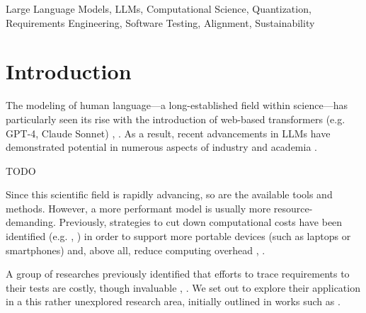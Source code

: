 \documentclass[conference]{IEEEtran}
\begin{document}
\begin{IEEEkeywords}
Large Language Models, LLMs, Computational Science, Quantization, Requirements
Engineering, Software Testing, Alignment, Sustainability
\end{IEEEkeywords}

\section{Introduction}\label{intro}


The modeling of human language---a long-established field within science---has
particularly seen its rise with the introduction of web-based transformers
(e.g. GPT-4, Claude Sonnet) \cite{jonesNaturalLanguageProcessing1994},
\cite{vaswaniAttentionAllYou2017}. As a result, recent advancements in LLMs
have demonstrated potential in numerous aspects of industry and academia
\cite{naveedComprehensiveOverviewLarge2024}.

TODO


Since this scientific field is rapidly advancing, so are the available tools and
methods. However, a more performant model is usually more resource-demanding.
Previously, strategies to cut down computational costs have been identified
(e.g. \cite{linAWQActivationawareWeight2024},
\cite{chenEfficientQATEfficientQuantizationAware2024}) in order to support more
portable devices (such as laptops or smartphones) and, above all, reduce
computing overhead \cite{zhuSurveyModelCompression2024},
\cite{rasleyDeepSpeedSystemOptimizations2020}.

A group of researches previously identified that efforts to trace requirements
to their tests are costly, though invaluable \cite{barmi2011Alignment}, \cite{AutomatedAlignmentSoftware}.
We set out to explore their application in a this rather unexplored research
area, initially outlined in works such as \cite{ivarsson2023automated}.
\end{document}
